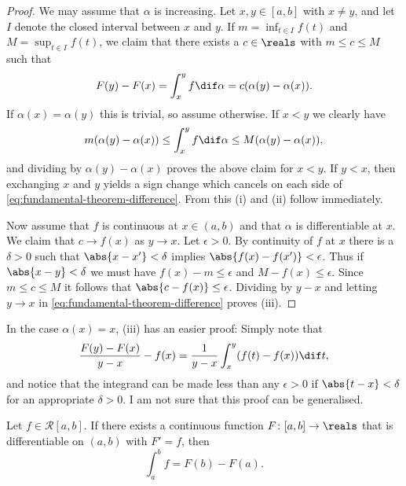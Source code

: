 \documentclass[article, a4paper, 11pt, oneside]{memoir}
\numberwithin{equation}{chapter}
\newcommand{\calR}{\mathcal{R}}
\begin{document}
\begin{proof}
    We may assume that $\alpha$ is increasing. Let $x,y \in [a,b]$ with $x \neq y$, and let $I$ denote the closed interval between $x$ and $y$. If $m = \inf_{t \in I} f(t)$ and $M = \sup_{t \in I} f(t)$, we claim that there exists a $c \in \reals$ with $m \leq c \leq M$ such that
    \begin{equation}
        \label{eq:fundamental-theorem-difference}
        F(y) - F(x)
            = \int_x^y f \dif\alpha
            = c (\alpha(y) - \alpha(x)).
    \end{equation}
    If $\alpha(x) = \alpha(y)$ this is trivial, so assume otherwise. If $x < y$ we clearly have
    \begin{equation*}
        m (\alpha(y) - \alpha(x))
            \leq \int_x^y f \dif\alpha
            \leq M (\alpha(y) - \alpha(x)),
    \end{equation*}
    and dividing by $\alpha(y) - \alpha(x)$ proves the above claim for $x < y$. If $y < x$, then exchanging $x$ and $y$ yields a sign change which cancels on each side of \cref{eq:fundamental-theorem-difference}. From this (i) and (ii) follow immediately.

    Now assume that $f$ is continuous at $x \in (a,b)$ and that $\alpha$ is differentiable at $x$. We claim that $c \to f(x)$ as $y \to x$. Let $\epsilon > 0$. By continuity of $f$ at $x$ there is a $\delta > 0$ such that $\abs{x-x'} < \delta$ implies $\abs{f(x) - f(x')} < \epsilon$. Thus if $\abs{x-y} < \delta$ we must have $f(x) - m \leq \epsilon$ and $M - f(x) \leq \epsilon$. Since $m \leq c \leq M$ it follows that $\abs{c - f(x)} \leq \epsilon$. Dividing by $y-x$ and letting $y \to x$ in \cref{eq:fundamental-theorem-difference} proves (iii).
\end{proof}


\begin{remark}
    In the case $\alpha(x) = x$, (iii) has an easier proof: Simply note that
    \begin{equation*}
        \frac{F(y)-F(x)}{y-x} - f(x)
            = \frac{1}{y-x} \int_x^y (f(t) - f(x)) \dif t,
    \end{equation*}
    and notice that the integrand can be made less than any $\epsilon > 0$ if $\abs{t-x} < \delta$ for an appropriate $\delta > 0$. I am not sure that this proof can be generalised.
\end{remark}


\begin{theorem}
    Let $f \in \calR[a,b]$. If there exists a continuous function $F \colon [a,b] \to \reals$ that is differentiable on $(a,b)$ with $F' = f$, then
    \begin{equation*}
        \int_a^b f
            = F(b) - F(a).
    \end{equation*}
\end{theorem}
\end{document}

